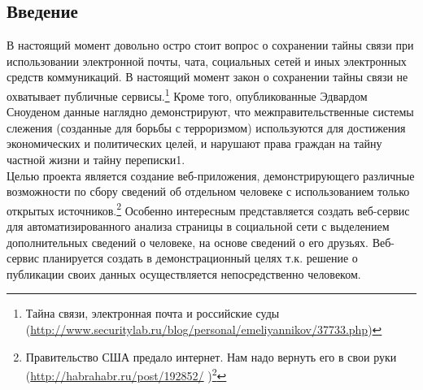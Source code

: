 \begin{chap1} %
\newpage
\section{Введение}
В настоящий момент довольно остро стоит вопрос о сохранении тайны связи при использовании электронной почты, чата, социальных сетей и иных электронных средств коммуникаций. В настоящий момент  закон о сохранении тайны связи не охватывает публичные сервисы.\footnote{ Тайна связи, электронная почта и российские суды (\url{http://www.securitylab.ru/blog/personal/emeliyannikov/37733.php})}
Кроме того, опубликованные Эдвардом Сноуденом данные наглядно демонстрируют, что межправительственные системы слежения (созданные для борьбы с терроризмом) используются для достижения экономических и политических целей, и нарушают права граждан на тайну частной жизни и тайну переписки1.\\

Целью проекта является создание веб-приложения, демонстрирующего различные возможности по сбору сведений об отдельном человеке с использованием только открытых источников.\footnote{Правительство США предало интернет. Нам надо вернуть его в свои руки     (\url{http://habrahabr.ru/post/192852/} )\footnote{Эдвард Сноуден (\url{http://ru.wikipedia.org/wiki/Сноуден,\_Эдвард})}} 
Особенно интересным представляется создать веб-сервис для автоматизированного анализа страницы в социальной сети с выделением дополнительных сведений о человеке, на основе сведений о его друзьях. Веб-сервис планируется создать в демонстрационный целях т.к. решение о публикации своих данных осуществляется непосредственно человеком.\\


\end{chap1}
